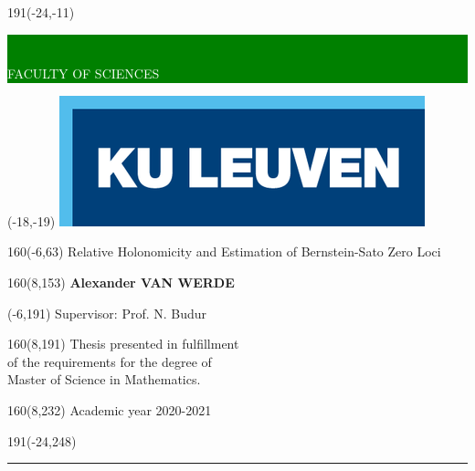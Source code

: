 \thispagestyle{empty}
\newcommand{\form}[1]{\scalebox{1.087}{\boldmath{#1}}}
\sffamily
%
\begin{textblock}{191}(-24,-11)
\colorbox{green}{\hspace{123mm}\ \parbox[c][18truemm]{68mm}{\textcolor{white}{FACULTY OF SCIENCES}}}
\end{textblock}
%
\begin{textblock}{70}(-18,-19)
\textblockcolour{}
\includegraphics*[height=19.8truemm]{Figures/LogoKULeuven}
\end{textblock}
%
\begin{textblock}{160}(-6,63)
\textblockcolour{}
\vspace{-\parskip}
\flushleft
\fontsize{40}{42}\selectfont \textcolor{bluetitle}{Relative Holonomicity and Estimation of Bernstein-Sato Zero Loci}\\[1.5mm]
\end{textblock}
%
%
\begin{textblock}{160}(8,153)
\textblockcolour{}
\vspace{-\parskip}
\flushright
\fontsize{14}{16}\selectfont \textbf{Alexander VAN WERDE}
\end{textblock}
%
\begin{textblock}{70}(-6,191)
\textblockcolour{}
\vspace{-\parskip}
\flushleft
Supervisor: Prof. N. Budur
\end{textblock}
%
\begin{textblock}{160}(8,191)
\textblockcolour{}
\vspace{-\parskip}
\flushright
Thesis presented in fulfillment  \\[4.5pt]
of the requirements for the degree of \\[4.5pt]
Master of Science in Mathematics.\\
\end{textblock}
%
\begin{textblock}{160}(8,232)
\textblockcolour{}
\vspace{-\parskip}
\flushright
Academic year 2020-2021
\end{textblock}
%
\begin{textblock}{191}(-24,248)
{\color{blueline}\rule{550pt}{5.5pt}}
\end{textblock}
%
\vfill
